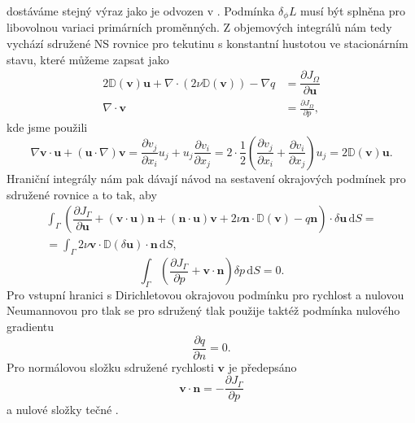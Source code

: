 dostáváme stejný výraz jako je odvozen v \cite{othmer2008continuous}.
Podmínka $ \delta_\phi L $ musí být splněna pro libovolnou variaci primárních proměnných. Z objemových integrálů nám tedy vychází sdružené NS rovnice pro tekutinu s konstantní hustotou ve stacionárním stavu, které můžeme zapsat jako
\begin{align}
2\mathbb{D}(\mathbf{v})\mathbf{u}
+ \nabla \cdot \left( 2\nu \mathbb{D}(\mathbf{v}) \right)
- \nabla q 
&=
\dfrac{\partial J_{\Omega}}{\partial \mathbf{u}} 
\\
\nabla \cdot \mathbf{v} 
&= 
\frac{\partial J_\Omega}{\partial p},
\end{align}
kde jsme použili  
\begin{equation*}
\nabla \mathbf{v}\cdot \mathbf{u}
+ (\mathbf{u} \cdot \nabla)\mathbf{v} 
=
\frac{\partial v_j}{\partial x_i}  u_j + u_j  \frac{\partial v_i}{\partial x_j} 
=
2\cdot\frac{1}{2}
\left(
\frac{\partial v_j}{\partial x_i}
+ \frac{\partial v_i}{\partial x_j} 
\right)
u_j
=
2\mathbb{D}(\mathbf{v})\mathbf{u}.
\end{equation*}
Hraniční integrály nám pak dávají návod na sestavení okrajových podmínek pro sdružené rovnice a to tak, aby
\begin{multline}
\label{eq:sdruzenaOP1}
\int_{\Gamma}
\left(
\dfrac{\partial J_{\Gamma}}{\partial \mathbf{u}}
+ (\mathbf{v}\cdot \mathbf{u} )\mathbf{n} 
+ (\mathbf{n} \cdot \mathbf{u}) \mathbf{v}
+ 2\nu \mathbf{n} \cdot  \mathbb{D}(\mathbf{v})
- q \mathbf{n}
\right)
\cdot \delta \mathbf{u}
\, \mathrm{d}S
= \\=
\int_{\Gamma} 
2\nu \mathbf{v} \cdot  \mathbb{D}(\delta \mathbf{u})\cdot \mathbf{n}
\, \mathrm{d}S,
\end{multline}
\begin{equation}\label{eq:sdruzenaOP2}
\int_{\Gamma}
\left(
\frac{\partial J_\Gamma}{\partial p}
+ \mathbf{v} \cdot \mathbf{n}
\right)
\delta p
\, \mathrm{d}S
= 0.
\end{equation}
Pro vstupní hranici s Dirichletovou okrajovou podmínku pro rychlost a nulovou Neumannovou pro tlak se pro sdružený tlak použije taktéž podmínka nulového gradientu
\begin{equation}\label{key}
\frac{\partial q}{\partial n}=0.
\end{equation} 
Pro normálovou složku sdružené rychlosti $\mathbf{v}$ je předepsáno
\begin{equation}
\mathbf{v}\cdot \mathbf{n}=-\dfrac{\partial J_{\Gamma}}{\partial p}
\end{equation}
a nulové složky tečné \cite{zymaris2009continuous}.

